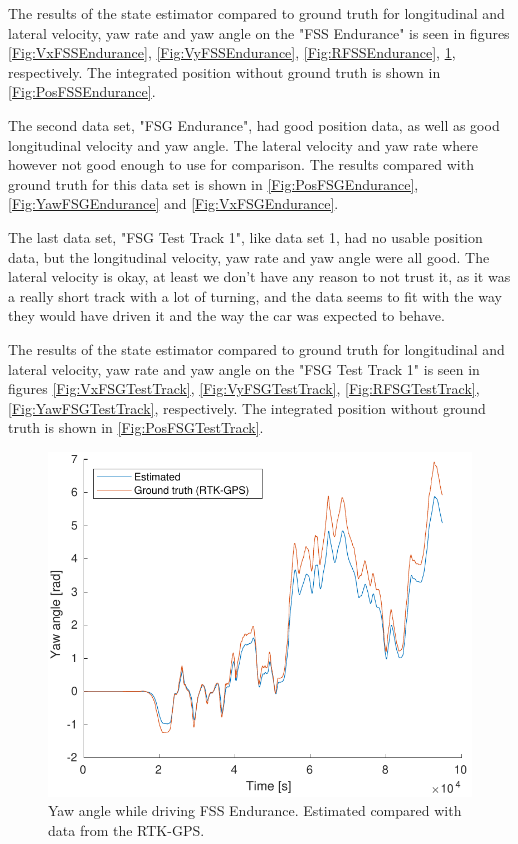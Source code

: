The results of the state estimator compared to ground truth for longitudinal  and lateral velocity, yaw rate and yaw angle on the "FSS Endurance" is seen in figures \ref{Fig:VxFSSEndurance}, \ref{Fig:VyFSSEndurance}, \ref{Fig:RFSSEndurance}, \ref{Fig:YawFSSEndurance}, respectively. The integrated position without ground truth is shown in \ref{Fig:PosFSSEndurance}. 

The second data set, "FSG Endurance", had good position data, as well as good longitudinal velocity and yaw angle. The lateral velocity and yaw rate where however not good enough to use for comparison. The results compared with ground truth for this data set is shown in \ref{Fig:PosFSGEndurance}, \ref{Fig:YawFSGEndurance} and \ref{Fig:VxFSGEndurance}. 

The last data set, "FSG Test Track 1", like data set 1, had no usable position data, but the longitudinal velocity, yaw rate and yaw angle were all good. The lateral velocity is okay, at least we don't have any reason to not trust it, as it was a really short track with a lot of turning, and the data seems to fit with the way they would have driven it and the way the car was expected to behave. 

The results of the state estimator compared to ground truth for longitudinal  and lateral velocity, yaw rate and yaw angle on the "FSG Test Track 1" is seen in figures \ref{Fig:VxFSGTestTrack}, \ref{Fig:VyFSGTestTrack}, \ref{Fig:RFSGTestTrack}, \ref{Fig:YawFSGTestTrack}, respectively. The integrated position without ground truth is shown in \ref{Fig:PosFSGTestTrack}. 



\begin{figure}
    \centering
    \includegraphics[width=0.8\linewidth]{0_Images/6_Results/yawFSSEndurance.pdf}
    \caption[Yaw angle while driving FSS Endurance.]
    {Yaw angle while driving FSS Endurance. Estimated compared with data from the RTK-GPS.}
    \label{Fig:YawFSSEndurance}
\end{figure}

